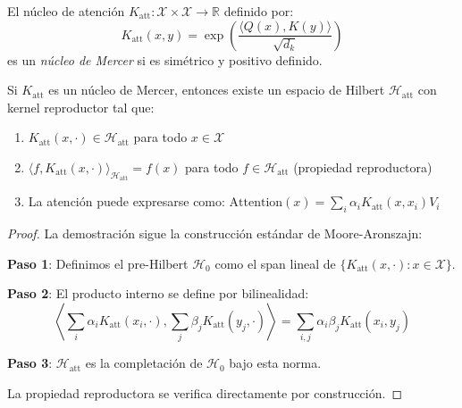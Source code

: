 \begin{definition}\label{def:attention_mercer_kernel}
    El núcleo de atención $K_{\text{att}}: \mathcal{X} \times \mathcal{X} \to \mathbb{R}$ definido por:
    \begin{equation}
        K_{\text{att}}(x, y) = \exp\left(\frac{\langle Q(x), K(y) \rangle}{\sqrt{d_k}}\right)
        \label{eq:attention_mercer_kernel}
    \end{equation}
    es un \textit{núcleo de Mercer} si es simétrico y positivo definido.
\end{definition}

\begin{theorem}\label{theorem:attention_rkhs}
    Si $K_{\text{att}}$ es un núcleo de Mercer, entonces existe un espacio de Hilbert $\mathcal{H}_{\text{att}}$ con kernel reproductor tal que:
    \begin{enumerate}
        \item $K_{\text{att}}(x, \cdot) \in \mathcal{H}_{\text{att}}$ para todo $x \in \mathcal{X}$
        \item $\langle f, K_{\text{att}}(x, \cdot) \rangle_{\mathcal{H}_{\text{att}}} = f(x)$ para todo $f \in \mathcal{H}_{\text{att}}$ (propiedad reproductora)
        \item La atención puede expresarse como: $\text{Attention}(x) = \sum_{i} \alpha_i K_{\text{att}}(x, x_i) V_i$
    \end{enumerate}
\end{theorem}

\begin{proof}
    La demostración sigue la construcción estándar de Moore-Aronszajn:
    
    \textbf{Paso 1}: Definimos el pre-Hilbert $\mathcal{H}_0$ como el span lineal de $\{K_{\text{att}}(x, \cdot) : x \in \mathcal{X}\}$.
    
    \textbf{Paso 2}: El producto interno se define por bilinealidad:
    \[\left\langle \sum_i \alpha_i K_{\text{att}}(x_i, \cdot), \sum_j \beta_j K_{\text{att}}(y_j, \cdot) \right\rangle = \sum_{i,j} \alpha_i \beta_j K_{\text{att}}(x_i, y_j)\]
    
    \textbf{Paso 3}: $\mathcal{H}_{\text{att}}$ es la completación de $\mathcal{H}_0$ bajo esta norma.
    
    La propiedad reproductora se verifica directamente por construcción.
\end{proof}

